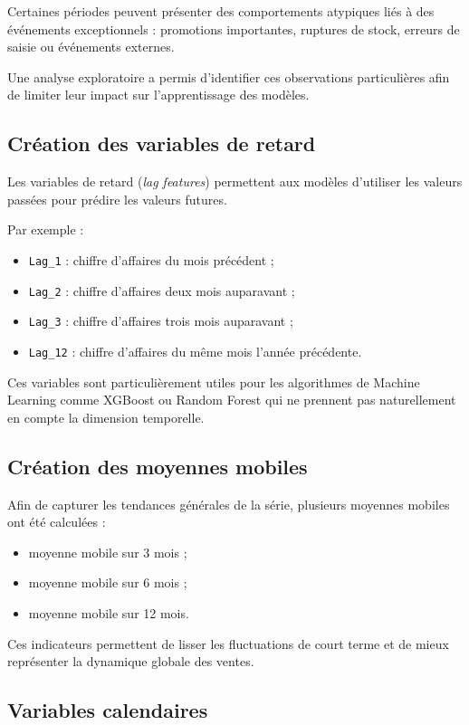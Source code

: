 \documentclass[12pt,a4paper,twoside]{report}
\begin{document}
Certaines périodes peuvent présenter des comportements atypiques liés à des événements exceptionnels : promotions importantes, ruptures de stock, erreurs de saisie ou événements externes.

Une analyse exploratoire a permis d'identifier ces observations particulières afin de limiter leur impact sur l'apprentissage des modèles.

\subsection{Création des variables de retard}

Les variables de retard (\textit{lag features}) permettent aux modèles d'utiliser les valeurs passées pour prédire les valeurs futures.

Par exemple :
\begin{itemize}
    \item \texttt{Lag\_1} : chiffre d'affaires du mois précédent ;
    \item \texttt{Lag\_2} : chiffre d'affaires deux mois auparavant ;
    \item \texttt{Lag\_3} : chiffre d'affaires trois mois auparavant ;
    \item \texttt{Lag\_12} : chiffre d'affaires du même mois l'année précédente.
\end{itemize}

Ces variables sont particulièrement utiles pour les algorithmes de Machine Learning comme XGBoost ou Random Forest qui ne prennent pas naturellement en compte la dimension temporelle.

\subsection{Création des moyennes mobiles}

Afin de capturer les tendances générales de la série, plusieurs moyennes mobiles ont été calculées :
\begin{itemize}
    \item moyenne mobile sur 3 mois ;
    \item moyenne mobile sur 6 mois ;
    \item moyenne mobile sur 12 mois.
\end{itemize}

Ces indicateurs permettent de lisser les fluctuations de court terme et de mieux représenter la dynamique globale des ventes.

\subsection{Variables calendaires}
\end{document}
